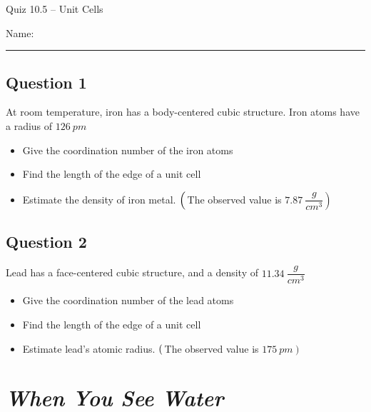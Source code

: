 \documentclass[11pt, letterpaper]{memoir}
\begin{document}
	\begin{center}
		{\large	Quiz 10.5 -- Unit Cells}
	\end{center}
	{\large Name: \rule[-1mm]{4in}{.1pt} 
	
	\subsection*{Question 1}
	At room temperature, iron has a body-centered cubic structure. Iron atoms have a radius of $126~pm$
	\begin{itemize}
		\item Give the coordination number of the iron atoms
		\item Find the length of the edge of a unit cell
		\item Estimate the density of iron metal. $\left(\vphantom{\dfrac{g}{cm^3}}\right.$The observed value is $\left.7.87~\dfrac{g}{cm^3}\right)$
	\end{itemize}
	
	\vspace{13em}
	\subsection*{Question 2}
	Lead has a face-centered cubic structure, and a density of $11.34~\dfrac{g}{cm^3}$
	\begin{itemize}
		\item Give the coordination number of the lead atoms
		\item Find the length of the edge of a unit cell
		\item Estimate lead's atomic radius. $\left(\vphantom{pm}\right.$The observed value is $\left.175~pm\right)$
	\end{itemize}

	\newpage
	\pagestyle{empty}
	\addtocounter{page}{-1}
  \section*{\emph{When You See Water}}
}
\end{document}

